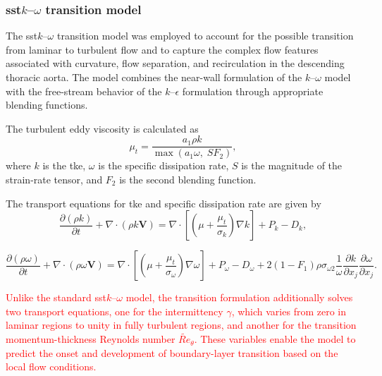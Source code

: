 \documentclass[12pt,a4paper]{article}
\newcommand{\TKE}{\ac{tke}\xspace}
\newcommand{\SST}{\ac{sst}\xspace}
\newcommand{\SSTcap}{\Ac{sst}\xspace}
\theoremstyle{definition}
\numberwithin{equation}{section}
\newcommand{\revision}[1]{\textcolor{red}{#1}}
\begin{document}
\subsubsection{\texorpdfstring{\SSTcap \(k\)--\(\omega\) transition model}{SST k-omega transition model}}

The \SST \(k\)--\(\omega\) transition model was employed to account for the possible transition from laminar to turbulent flow and to capture the complex flow features associated with curvature, flow separation, and recirculation in the descending thoracic aorta. The model combines the near-wall formulation of the \(k\)--\(\omega\) model with the free-stream behavior of the \(k\)--\(\epsilon\) formulation through appropriate blending functions.

The turbulent eddy viscosity is calculated as
\begin{equation}
    \mu_t =
    \frac{a_1 \rho k}{\max(a_1\omega,\;SF_2)},
    \label{eq:mutt}
\end{equation}
where \(k\) is the \TKE, \(\omega\) is the specific dissipation rate, \(S\) is the magnitude of the strain-rate tensor, and \(F_2\) is the second blending function.

The transport equations for \TKE and specific dissipation rate are given by
\begin{equation}
\frac{\partial(\rho k)}{\partial t}
+\nabla\cdot(\rho k\mathbf{V})
=
\nabla\cdot
\left[
\left(\mu+\frac{\mu_t}{\sigma_k}\right)\nabla k
\right]
+P_k-D_k,
\label{eq:keqn}
\end{equation}

\begin{equation}
\frac{\partial(\rho\omega)}{\partial t}
+\nabla\cdot(\rho\omega\mathbf{V})
=
\nabla\cdot
\left[
\left(\mu+\frac{\mu_t}{\sigma_\omega}\right)\nabla\omega
\right]
+P_\omega-D_\omega
+
2(1-F_1)\rho\sigma_{\omega2}
\frac{1}{\omega}
\frac{\partial k}{\partial x_j}
\frac{\partial\omega}{\partial x_j}.
\label{eq:omegaeqn}
\end{equation}

\revision{Unlike the standard \SST \(k\)--\(\omega\) model, the transition formulation additionally solves two transport equations, one for the intermittency \(\gamma\), which varies from zero in laminar regions to unity in fully turbulent regions, and another for the transition momentum-thickness Reynolds number \(\widetilde{Re}_\theta\). These variables enable the model to predict the onset and development of boundary-layer transition based on the local flow conditions.}
\end{document}
